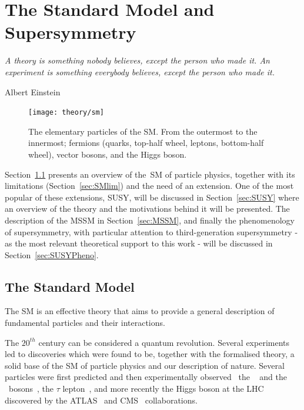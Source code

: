 \chapter{The Standard Model and Supersymmetry}
\label{ch:theory} 
\epigraph{\emph{A theory is something nobody believes, except the person who made it. An experiment is something everybody believes, except the person who made it.}} {Albert Einstein}

	\begin{figure}
		\centering
			\texttt{[image: theory/sm]}
		\caption{\label{fig:sm_el_part} The elementary particles of the \ac{SM}. From the outermost to the innermost; fermions (quarks, top-half wheel, leptons, bottom-half wheel), vector bosons, and the Higgs boson.}
	\end{figure}				

	Section~\ref{sec:SMov} presents an overview of the~\ac{SM} of particle physics, together with its limitations (Section~\ref{sec:SMlim}) and the need of an extension. One of the most popular of these extensions, \ac{SUSY}, will be discussed in Section~\ref{sec:SUSY} where an overview of the theory and the motivations behind it will be presented. The description of the \ac{MSSM} in Section~\ref{sec:MSSM}, and finally the phenomenology of supersymmetry, with particular attention to third-generation supersymmetry - as the most relevant theoretical support to this work - will be discussed in Section~\ref{sec:SUSYPheno}.


	\section{The Standard Model}
	\label{sec:SMov}

		The \ac{SM} is an effective theory that aims to provide a general description of fundamental particles and their interactions. %

		The $20^{th}$ century can be considered a quantum revolution. Several experiments led to discoveries which were found to be, together with the formalised theory, a solid base of the \ac{SM} of particle physics and our description of nature. Several particles were first predicted and then experimentally observed \eg\ the \Wboson~\cite{WbosonDiscovery} and the \Zboson\ bosons~\cite{ZbosonDiscovery}, the $\tau$ lepton~\cite{tauDiscovery}, and more recently the Higgs boson at the \ac{LHC} discovered by the \acs{ATLAS}~\cite{ATLASHiggs2012} and \acs{CMS}~\cite{CMSHiggs2012} collaborations.

